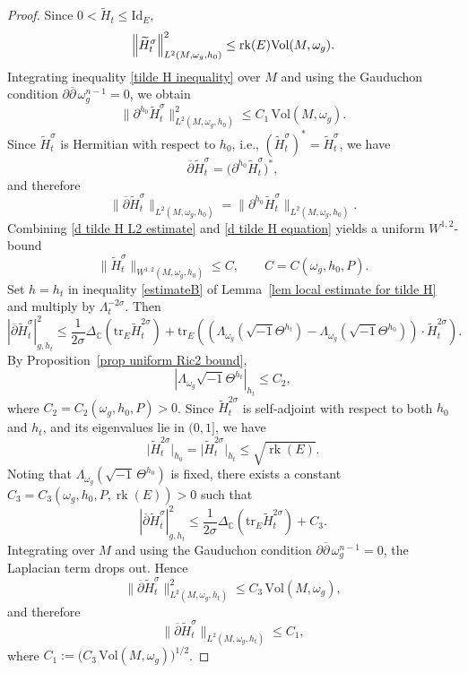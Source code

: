\documentclass[12pt, reqno]{amsart}
\newcommand{\id}{{\rm id}}
\newcommand{\rk}{{\rm rk}}
\newcommand\bp{{\bar\partial}}
\theoremstyle{plain}
\theoremstyle{definition}
\newcommand{\bproof}{\begin{proof}}
\newcommand{\eproof}{\end{proof}}
\newcommand{\sq}{\sqrt{-1}}
\renewcommand{\bar}{\overline}
\newcommand{\beq}{\begin{equation}}
\newcommand{\eeq}{\end{equation}}
\renewcommand{\tilde}{\widetilde}
\renewcommand{\bp}{\bar{\partial}}
\renewcommand{\>}{\rightarrow}
\newcommand{\C}{{\mathbb C}}
\renewcommand{\>}{\rightarrow}
\renewcommand{\bp}{{\bar{\partial}}}
\newcommand{\om}{\omega}
\renewcommand{\bar}{\overline}
\renewcommand{\tilde}{\widetilde}
\newcommand{\tr}{\mathrm{tr}}
\renewcommand{\id}{\mathrm{Id}}
\numberwithin{equation}{section} %
\begin{document}
\bproof
Since $0<\tilde H_t\leq\id_E$,
\beq
\left\| \tilde H_t^\sigma \right\|_{L^2(M,\omega_g, h_0)}^2
\leq \rk(E)\mathrm{Vol}(M,\om_g). \label{tilde H L2 estimate}
\eeq
Integrating inequality \eqref{tilde H inequality} over $M$
and using the Gauduchon condition $\partial\bar{\partial}\,\omega_g^{n-1}=0$,
we obtain
\begin{equation}
\label{d tilde H L2 estimate}
\bigl\|\partial^{h_0}\tilde H_t^\sigma\bigr\|_{L^2(M,\omega_g, h_0)}^2
\leq  C_1\,\mathrm{Vol}(M,\omega_g).
\end{equation}
Since $\tilde H_t^\sigma$ is Hermitian with respect to $h_0$, i.e.,  $(\tilde H_t^\sigma)^*=\tilde H_t^\sigma$,
we have
\[
\bar{\partial}\tilde H_t^\sigma
= \bigl(\partial^{h_0}\tilde H_t^\sigma\bigr)^*,
\]
and therefore
\begin{equation}
\label{d tilde H equation}
\bigl\|\bar{\partial}\tilde H_t^\sigma\bigr\|_{L^2(M,\omega_g, h_0)}
= \bigl\|\partial^{h_0}\tilde H_t^\sigma\bigr\|_{L^2(M,\omega_g, h_0)}.
\end{equation}
Combining \eqref{d tilde H L2 estimate} and \eqref{d tilde H equation}
yields a uniform $W^{1,2}$-bound
\[
\|\tilde H_t^\sigma\|_{W^{1,2}(M,\omega_g, h_0)} \le C,
\qquad C=C(\omega_g,h_0,P).
\]
Set $h=h_t$ in inequality \eqref{estimateB} of Lemma~\ref{lem local estimate for tilde H}
and multiply by $\Lambda_t^{-2\sigma}$. Then
\beq
\left|\bp \tilde H^\sigma_t \right|_{g,h_t}^2
\leq  \frac{1}{2\sigma}\Delta_\C\left(\tr_E\tilde H_t^{2\sigma}\right)
+\tr_E\left(\left(\Lambda_{\om_g}\left(\sq \Theta^{h_t}\right)-\Lambda_{\om_g}\left(\sq \Theta^{h_0}\right)\right)\cdot \tilde H_t^{2\sigma}\right).
\eeq
By Proposition~\ref{prop uniform Ric2 bound},
\beq \left|\Lambda_{\om_g}\sq\Theta^{h_t}\right|_{h_t}\leq C_2,\eeq  where
$C_2=C_2(\om_g,h_0,P)>0$.  Since $\tilde H_t^{2\sigma}$ is self‑adjoint with respect to both $h_0$ and $h_t$,
and its eigenvalues lie in $(0,1]$, we have
\beq 
\bigl|\tilde H_t^{2\sigma}\bigr|_{h_0}
=
\bigl|\tilde H_t^{2\sigma}\bigr|_{h_t}
\le \sqrt{\operatorname{rk}(E)}.
\eeq 
Noting that $\Lambda_{\omega_g}\left(\sqrt{-1}\,\Theta^{h_0}\right)$ is fixed,
there exists a constant $
C_3=C_3(\omega_g,h_0,P,\operatorname{rk}(E))>0
$
such that
\beq
\left|\bp \tilde H^\sigma_t \right|_{g,h_t}^2
\leq  \frac{1}{2\sigma}\Delta_\C\left(\tr_E\tilde H_t^{2\sigma}\right)+C_3.
\eeq
Integrating over $M$ and using the Gauduchon condition
$\partial\bar{\partial}\,\omega_g^{n-1}=0$,
the Laplacian term drops out. Hence
$$
\bigl\|\bar{\partial}\tilde H^\sigma_t\bigr\|_{L^2(M,\omega_g,h_t)}^2
\le C_3\,\mathrm{Vol}(M,\omega_g),
$$
and therefore
$$
\bigl\|\bar{\partial}\tilde H^\sigma_t\bigr\|_{L^2(M,\omega_g,h_t)}
\le C_1,
$$
where $C_1:=\bigl(C_3\,\mathrm{Vol}(M,\omega_g)\bigr)^{1/2}$.
\eproof
\end{document}
